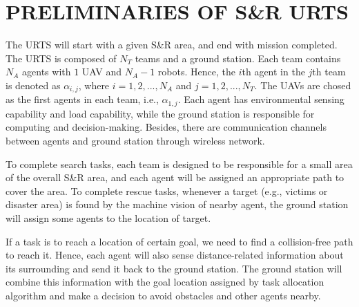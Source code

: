 \documentclass{ieeeaccess}
\begin{document}
\section{PRELIMINARIES OF S\&R URTS}
The URTS will start with a given S\&R area, and end with mission completed. The URTS is composed of $N_T$ teams and a ground station. Each team contains $N_A$ agents with $1$ UAV and $N_A-1$ robots. Hence, the $i$th agent in the $j$th team is denoted as $\alpha_{i,j}$, where $i=1,2,...,N_A$ and $j=1,2,...,N_T$. The UAVs are chosed as the first agents in each team, i.e., $\alpha_{1,j}$. Each agent has environmental sensing capability and load capability, while the ground station is responsible for computing and decision-making. Besides, there are communication channels between agents and ground station through wireless network.

To complete search tasks, each team is designed to be responsible for a small area of the overall S\&R area, and each agent will be assigned an appropriate path to cover the area. To complete rescue tasks, whenever a target (e.g., victims or disaster area) is found by the machine vision of nearby agent, the ground station will assign some agents to the location of target. 

If a task is to reach a location of certain goal, we need to find a collision-free path to reach it. 
Hence, each agent will also sense distance-related information about its surrounding and send it back to the ground station. The ground station will combine this information with the goal location assigned by task allocation algorithm and make a decision to avoid obstacles and other agents nearby.
\end{document}
